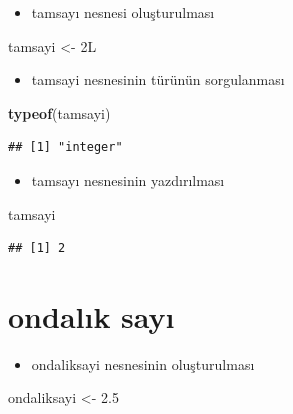 \documentclass[
  oneside]{book}
\newenvironment{Shaded}{\begin{snugshade}}{\end{snugshade}}
\newcommand{\FloatTok}[1]{\textcolor[rgb]{0.00,0.00,0.81}{#1}}
\newcommand{\FunctionTok}[1]{\textcolor[rgb]{0.13,0.29,0.53}{\textbf{#1}}}
\newcommand{\NormalTok}[1]{#1}
\newcommand{\OtherTok}[1]{\textcolor[rgb]{0.56,0.35,0.01}{#1}}
\providecommand{\tightlist}{%
  \setlength{\itemsep}{0pt}\setlength{\parskip}{0pt}}
\begin{document}
\begin{itemize}
\tightlist
\item
  tamsayı nesnesi oluşturulması
\end{itemize}

\begin{Shaded}
\begin{Highlighting}[]
\NormalTok{tamsayi }\OtherTok{\textless{}{-}}\NormalTok{ 2L}
\end{Highlighting}
\end{Shaded}

\begin{itemize}
\tightlist
\item
  tamsayi nesnesinin türünün sorgulanması
\end{itemize}

\begin{Shaded}
\begin{Highlighting}[]
\FunctionTok{typeof}\NormalTok{(tamsayi)}
\end{Highlighting}
\end{Shaded}

\begin{verbatim}
## [1] "integer"
\end{verbatim}

\begin{itemize}
\tightlist
\item
  tamsayı nesnesinin yazdırılması
\end{itemize}

\begin{Shaded}
\begin{Highlighting}[]
\NormalTok{tamsayi}
\end{Highlighting}
\end{Shaded}

\begin{verbatim}
## [1] 2
\end{verbatim}

\hypertarget{ondalux131k-sayux131}{%
\section{ondalık sayı}\label{ondalux131k-sayux131}}

\begin{itemize}
\tightlist
\item
  ondaliksayi nesnesinin oluşturulması
\end{itemize}

\begin{Shaded}
\begin{Highlighting}[]
\NormalTok{ondaliksayi }\OtherTok{\textless{}{-}} \FloatTok{2.5}
\end{Highlighting}
\end{Shaded}
\end{document}
